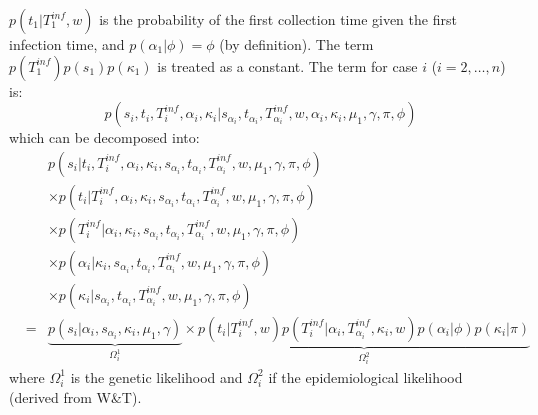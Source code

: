 \documentclass[10pt]{article}
\begin{document}
$p(t_1 | T_1^{inf},w)$ is the probability of the first collection time given the first infection time, and $p(\alpha_1 | \phi)=\phi$ (by definition).
The term $p(T_1^{inf}) p(s_1) p(\kappa_1)$ is treated as a constant.
The term for case $i$ ($i=2,\ldots,n$) is:
\begin{equation}
 p(s_i, t_i, T_i^{inf}, \alpha_i, \kappa_i| s_{\alpha_i}, t_{\alpha_i}, T_{\alpha_i}^{inf},  w, \alpha_i, \kappa_i, \mu_1, \gamma, \pi, \phi)
\end{equation}
which can be decomposed into:
\begin{eqnarray}
& & p(s_i | t_i, T_i^{inf}, \alpha_i, \kappa_i, s_{\alpha_i}, t_{\alpha_i}, T_{\alpha_i}^{inf},  w, \mu_1, \gamma, \pi, \phi) \nonumber \\
& &  \times  p(t_i | T_i^{inf}, \alpha_i, \kappa_i, s_{\alpha_i}, t_{\alpha_i}, T_{\alpha_i}^{inf},  w, \mu_1, \gamma, \pi, \phi) \nonumber \\
& & \times  p(T_i^{inf}| \alpha_i, \kappa_i, s_{\alpha_i}, t_{\alpha_i}, T_{\alpha_i}^{inf},  w, \mu_1, \gamma, \pi, \phi) \nonumber \\
& & \times  p(\alpha_i | \kappa_i, s_{\alpha_i}, t_{\alpha_i}, T_{\alpha_i}^{inf},  w, \mu_1, \gamma, \pi, \phi) \nonumber \\
& & \times  p(\kappa_i | s_{\alpha_i}, t_{\alpha_i}, T_{\alpha_i}^{inf},  w, \mu_1, \gamma, \pi, \phi) \nonumber \\
& = & 
\underbrace{p(s_i | \alpha_i, s_{\alpha_i}, \kappa_i, \mu_1, \gamma)}_{\Omega_i^1} 
  \times  \underbrace{p(t_i | T_i^{inf}, w) 
  p(T_i^{inf}| \alpha_i, T_{\alpha_i}^{inf}, \kappa_i, w) p(\alpha_i | \phi) p(\kappa_i | \pi)}_{\Omega_i^2}
\end{eqnarray}
\noindent where $\Omega_i^1$ is the genetic likelihood and $\Omega_i^2$ if the epidemiological likelihood (derived from W\&T).
\\
\end{document}
